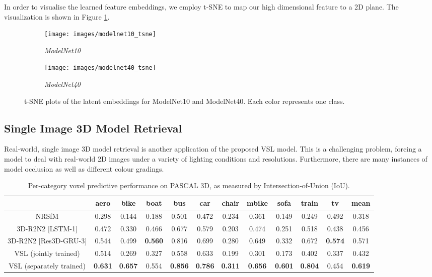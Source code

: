 \documentclass[10pt,twocolumn,letterpaper]{article}
\begin{document}
In order to visualise the learned feature embeddings, we employ t-SNE \cite{maaten2008visualizing} to map our high dimensional feature to a 2D plane. The visualization is shown in Figure \ref{fig:tsne_viz}.

\begin{figure}[ht!]
  \centering
  \begin{subfigure}[b]{0.2\textwidth}
    \centering
    \texttt{[image: images/modelnet10\_tsne]}
    \caption*{\it ModelNet10}
  \end{subfigure}
  \qquad
  \begin{subfigure}[b]{0.2\textwidth}
    \centering
    \texttt{[image: images/modelnet40\_tsne]}
    \caption*{\it ModelNet40}
  \end{subfigure}
  \caption{t-SNE plots of the latent embeddings for ModelNet10 and ModelNet40. Each color represents one class.}
  \label{fig:tsne_viz}
\end{figure}
\vspace{-0.5em}

\subsection{Single Image 3D Model Retrieval}
\label{subsec:imrec}
Real-world, single image 3D model retrieval is another application of the proposed VSL model. This is a challenging problem, forcing a model to deal with real-world 2D images under a variety of lighting conditions and resolutions. Furthermore, there are many instances of model occlusion as well as different colour gradings.

\begin{table*}[ht!]
  \centering
  \small
  \setlength\tabcolsep{6pt}
    \begin{tabular}{|c||c|c|c|c|c|c|c|c|c|c||c|}
      \hline
     & {\bf aero}  & {\bf bike}  & {\bf boat}  & {\bf bus}   & {\bf car}   & {\bf chair} & {\bf mbike} & {\bf sofa } & {\bf train} & {\bf tv}    & {\bf mean} \\
      \hline
    NRSfM & 0.298 & 0.144 & 0.188 & 0.501 & 0.472 & 0.234 & 0.361 & 0.149 & 0.249 & 0.492 & 0.318 \\
      \hline
    3D-R2N2 [LSTM-1] & 0.472 & 0.330  & 0.466 & 0.677 & 0.579 & 0.203 & 0.474 & 0.251 & 0.518 & 0.438 & 0.456 \\
      \hline
      3D-R2N2 [Res3D-GRU-3] & 0.544 & 0.499 & {\bf 0.560}  & 0.816 & 0.699 & 0.280  & 0.649 & 0.332 & 0.672 & {\bf 0.574} & 0.571 \\
      \hline
      VSL (jointly trained) & 0.514 & 0.269 & 0.327  & 0.558 & 0.633 & 0.199  & 0.301 & 0.173 & 0.402 & 0.337 & 0.432 \\
      \hline
      VSL (separately trained) & {\bf 0.631} & {\bf 0.657} & 0.554  & {\bf 0.856} & {\bf 0.786} & {\bf 0.311}  & {\bf 0.656} & {\bf 0.601} & {\bf 0.804} & 0.454 & {\bf 0.619} \\
    \hline
    \end{tabular}\caption{Per-category voxel predictive performance on PASCAL 3D, as measured by Intersection-of-Union (IoU).}
  \label{tab:ioucompare}
\end{table*}
\end{document}
